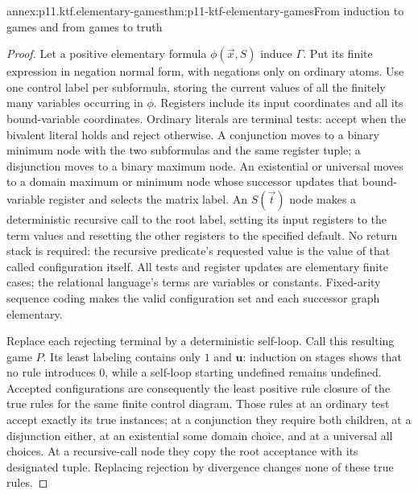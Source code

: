 \begin{annexitem}{annex:p11.ktf.elementary-games}{thm:p11-ktf-elementary-games}{From induction to games and from games to truth}
\begin{proof}
Let a positive elementary formula \(\phi(\vec x,S)\)
induce \(\Gamma\). Put its finite expression in negation normal
form, with negations only on ordinary atoms. Use one control label
per subformula, storing the current values of all the finitely many
variables occurring in \(\phi\). Registers include its input
coordinates and all its bound-variable coordinates. Ordinary literals
are terminal tests: accept when the bivalent literal holds and reject
otherwise. A conjunction moves to a binary minimum node with the
two subformulas and the same register tuple; a disjunction moves to
a binary maximum node. An existential or universal moves to a
domain maximum or minimum node whose successor updates that
bound-variable register and selects the matrix label. An
\(S(\vec t)\) node makes a deterministic recursive call to
the root label, setting its input registers to the term values and
resetting the other registers to the specified default. No return
stack is required: the recursive predicate's requested value is
the value of that called configuration itself. All tests and register
updates are elementary finite cases; the relational language's terms
are variables or constants. Fixed-arity sequence coding makes the
valid configuration set and each successor graph elementary.

Replace each rejecting terminal by a deterministic self-loop.
Call this resulting game \(P\). Its least labeling contains
only \(1\) and \(\mathbf u\): induction on stages shows
that no rule introduces \(0\), while a self-loop starting
undefined remains undefined. Accepted configurations are consequently
the least positive rule closure of the true rules for the same finite
control diagram. Those rules at an ordinary test accept exactly
its true instances; at a conjunction they require both children,
at a disjunction either, at an existential some domain choice, and
at a universal all choices. At a recursive-call node they copy
the root acceptance with its designated tuple. Replacing rejection
by divergence changes none of these true rules.


\end{proof}
\end{annexitem}

